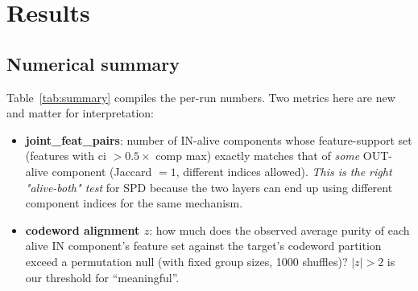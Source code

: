 \documentclass[11pt]{article}
\begin{document}
\section{Results}

\subsection{Numerical summary}

Table~\ref{tab:summary} compiles the per-run numbers. Two metrics here
are new and matter for interpretation:
\begin{itemize}
\item \textbf{joint\_feat\_pairs}: number of IN-alive components whose
  feature-support set (features with ci $> 0.5 \times$ comp max) exactly
  matches that of \emph{some} OUT-alive component (Jaccard $= 1$,
  different indices allowed). \emph{This is the right "alive-both" test}
  for SPD because the two layers can end up using different component
  indices for the same mechanism.
\item \textbf{codeword alignment $z$}: how much does the observed average
  purity of each alive IN component's feature set against the target's
  codeword partition exceed a permutation null (with fixed group sizes,
  1000 shuffles)? $|z| > 2$ is our threshold for ``meaningful''.
\end{itemize}
\end{document}
